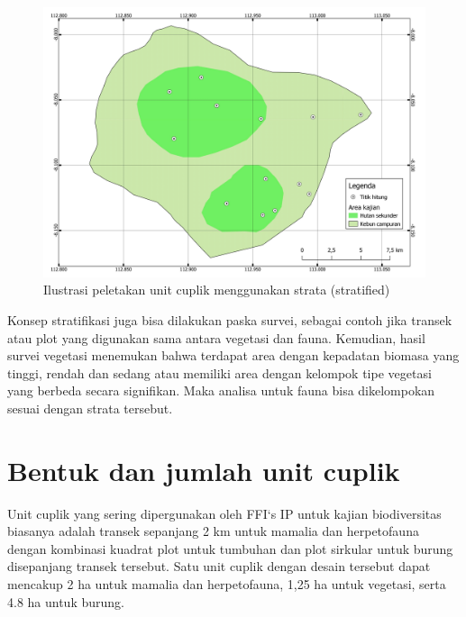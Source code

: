 \documentclass[
  oneside]{book}
\begin{document}
\begin{figure}

{\centering \includegraphics[width=1\linewidth]{images/randomstrat} 

}

\caption{Ilustrasi peletakan unit cuplik menggunakan strata (stratified)}\label{fig:randomstrat}
\end{figure}

Konsep stratifikasi juga bisa dilakukan paska survei, sebagai contoh jika transek atau plot yang digunakan sama antara vegetasi dan fauna. Kemudian, hasil survei vegetasi menemukan bahwa terdapat area dengan kepadatan biomasa yang tinggi, rendah dan sedang atau memiliki area dengan kelompok tipe vegetasi yang berbeda secara signifikan. Maka analisa untuk fauna bisa dikelompokan sesuai dengan strata tersebut.

\hypertarget{bentuk-dan-jumlah-unit-cuplik}{%
\section*{Bentuk dan jumlah unit cuplik}\label{bentuk-dan-jumlah-unit-cuplik}}

Unit cuplik yang sering dipergunakan oleh FFI`s IP untuk kajian biodiversitas biasanya adalah transek sepanjang 2 km untuk mamalia dan herpetofauna dengan kombinasi kuadrat plot untuk tumbuhan dan plot sirkular untuk burung disepanjang transek tersebut. Satu unit cuplik dengan desain tersebut dapat mencakup 2 ha untuk mamalia dan herpetofauna, 1,25 ha untuk vegetasi, serta 4.8 ha untuk burung.
\end{document}
